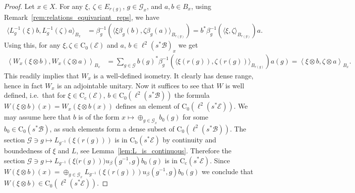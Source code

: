 \documentclass[11 pt, leqno]{amsart}
\numberwithin{equation}{section}
\theoremstyle{plain}
\theoremstyle{definition}
\newcommand*{\contc}{\mathrm{C_c}}%
\newcommand*{\contz}{\mathrm{C_0}}%
\newcommand*{\contb}{\mathrm{C_b}}%
\newcommand{\B}{\mathcal B}
\newcommand{\G}{\mathcal G} %
\newcommand{\EE}{\mathcal E}
\begin{document}
\begin{proof}
Let $x \in X$.
For any $\xi, \ \zeta \in E_{r(g)}$, $g\in \G_x$, and $a, b \in B_{x}$, using Remark~\ref{rem:relations_equivariant_reps}, we have 
\[
\begin{split}
    \langle L_{g}^{-1}(\xi) b ,L_{g}^{-1}(\zeta)a\rangle_{B_{x}} &= \beta_{g}^{-1}(\langle \xi \beta_g(b), \zeta \beta_g(a)\rangle_{B_{r(g)}}) = b^* \beta_{g}^{-1}( \langle \xi , \zeta \rangle_{B_{r(g)}} ) a .
\end{split}
\]
Using this, for any $\xi,\zeta \in \contz(\EE)$ and $a$, $ b\in \ell^2(s^*\B)_x$ we get
\[
\begin{split}
    \left\langle W_x \left(\xi\otimes b\right) , W_x \left(\zeta\otimes  a\right) \right \rangle_{B_x} &= \sum_{g\in \G} b(g)^* \beta_{g}^{-1}( \langle \xi(r(g))  , \zeta(r(g))\rangle_{B_{r(g)}} ) a(g) %
    =\left\langle \xi\otimes b , \zeta\otimes  a\right\rangle_{B_x}.
\end{split}
\]
This readily implies that $W_x$ is a well-defined isometry. 
It clearly has dense range, hence in fact $W_x$ is an adjointable unitary.
Now it suffices to see that $W$ is well defined, i.e.\ that for $\xi \in \contc(\EE)$, $b\in \contz(\ell^2(s^*\B))$ the formula $W(\xi\otimes b )(x)= W_x(\xi \otimes b(x) )$ defines an element of $\contz(\ell^2(s^*\EE))$.
We may assume here that $b$ is of the form $x\mapsto \oplus_{g\in \G_x} b_0(g)$ for some $b_0\in \contz(s^*\B)$, as such elements form a dense subset of $\contz(\ell^2(s^*\B))$. 
The section $\G\ni g\mapsto L_{g^{-1}}\left(\xi(r(g))\right)$ is in $\contb(s^*\EE)$ by continuity and boundedness of $\xi$ and $L$, see Lemma~\ref{lem:L_is_continuous}. 
Therefore the section $\G\ni g\mapsto L_{g^{-1}}\left(\xi(r(g)\right))u_{\beta}(g^{-1},g)b_0(g)$ is in $\contc(s^*\EE)$. 
Since $W(\xi\otimes b )(x) = \oplus_{g\in \G_x} L_{g^{-1}} \left( \xi(r(g)) \right) u_{\beta}(g^{-1},g)b_0(g)$ we conclude that $W(\xi\otimes b )\in \contz(\ell^2(s^*\EE))$.


\end{proof}
\end{document}
